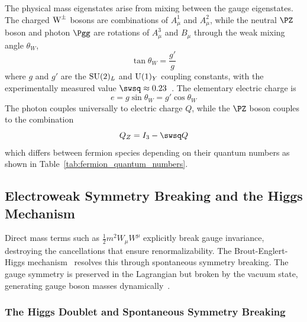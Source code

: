 The physical mass eigenstates arise from mixing between the gauge eigenstates. The charged $\text{W}^\pm$ bosons are combinations of $A^1_\mu$ and $A^2_\mu$, while the neutral $\PZ$ boson and photon $\Pgg$ are rotations of $A^3_\mu$ and $B_\mu$ through the weak mixing angle $\theta_W$,
\begin{equation}
\tan\theta_W = \frac{g'}{g}
\end{equation}
where $g$ and $g'$ are the $\mathrm{SU}(2)_L$ and $\mathrm{U}(1)_Y$ coupling constants, with the experimentally measured value $\swsq \approx 0.23$~\cite{PDG2024}. The elementary electric charge is
\begin{equation}
e = g \sin\theta_W = g' \cos\theta_W
\label{eq:electric_charge}
\end{equation}
The photon couples universally to electric charge $Q$, while the $\PZ$ boson couples to the combination
\begin{equation}
Q_Z = I_3 - \swsq Q
\label{eq:z_coupling}
\end{equation}
which differs between fermion species depending on their quantum numbers as shown in Table~\ref{tab:fermion_quantum_numbers}.

\subsection{Electroweak Symmetry Breaking and the Higgs Mechanism}
\label{sec:ewsb}

Direct mass terms such as $\frac{1}{2}m^2 W_\mu W^\mu$ explicitly break gauge invariance, destroying the cancellations that ensure renormalizability. The Brout-Englert-Higgs mechanism~\cite{Englert:1964et,Higgs:1964pj,Guralnik:1964eu} resolves this through spontaneous symmetry breaking. The gauge symmetry is preserved in the Lagrangian but broken by the vacuum state, generating gauge boson masses dynamically~\cite{tHooft:1971qjg}.

\subsubsection{The Higgs Doublet and Spontaneous Symmetry Breaking}

